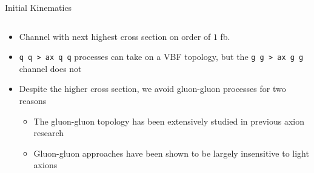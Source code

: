 \documentclass[handout]{beamer}
\begin{document}
\begin{frame}{Initial Kinematics}
\begin{columns}
\begin{column}{0.5\linewidth}
\begin{block}
\begin{itemize}[<+(1)->]
                    \item Channel with next highest cross section on order of $1$ fb.
                    \item \texttt{q q > ax q q} processes can take on a VBF topology, but the \texttt{g g > ax g g} channel does not
                    \item Despite the higher cross section, we avoid gluon-gluon processes for two reasons
                    \begin{itemize}[<+(1)->]
                        \item The gluon-gluon topology has been extensively studied in previous axion research
                        \item Gluon-gluon approaches have been shown to be largely insensitive to light axions
                    \end{itemize}
                \end{itemize}
            \end{block}
        \end{column}
    \end{columns}
\end{frame}
\end{document}
